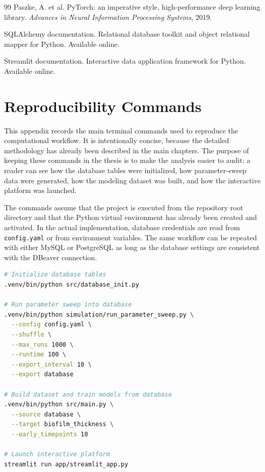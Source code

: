 \documentclass[12pt,a4paper,oneside]{report}
\begin{document}
\begin{thebibliography}{99}
 Paszke, A. et al. PyTorch: an imperative style, high-performance deep learning library. \textit{Advances in Neural Information Processing Systems}, 2019.

 SQLAlchemy documentation. Relational database toolkit and object relational mapper for Python. Available online.

 Streamlit documentation. Interactive data application framework for Python. Available online.

\end{thebibliography}

\appendix
{}
\titlespacing*{\chapter}{0pt}{1.2ex}{1.0ex}

\chapter{Reproducibility Commands}
This appendix records the main terminal commands used to reproduce the computational workflow. It is intentionally concise, because the detailed methodology has already been described in the main chapters. The purpose of keeping these commands in the thesis is to make the analysis easier to audit: a reader can see how the database tables were initialized, how parameter-sweep data were generated, how the modeling dataset was built, and how the interactive platform was launched.

The commands assume that the project is executed from the repository root directory and that the Python virtual environment has already been created and activated. In the actual implementation, database credentials are read from \texttt{config.yaml} or from environment variables. The same workflow can be repeated with either MySQL or PostgreSQL as long as the database settings are consistent with the DBeaver connection.

\begin{small}
\begin{lstlisting}[language=bash]
# Initialize database tables
.venv/bin/python src/database_init.py

# Run parameter sweep into database
.venv/bin/python simulation/run_parameter_sweep.py \
  --config config.yaml \
  --shuffle \
  --max_runs 1000 \
  --runtime 100 \
  --export_interval 10 \
  --export database

# Build dataset and train models from database
.venv/bin/python src/main.py \
  --source database \
  --target biofilm_thickness \
  --early_timepoints 10

# Launch interactive platform
streamlit run app/streamlit_app.py
\end{lstlisting}
\end{small}
\end{document}
